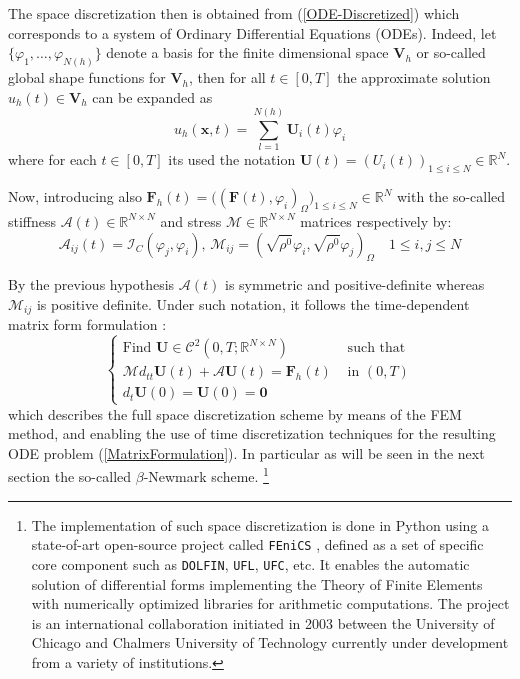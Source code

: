 The space discretization then is obtained from (\ref{ODE-Discretized}) which corresponds to a system of Ordinary Differential Equations (ODEs). Indeed, let $\{ \varphi_1, \dots, \varphi_{N(h)} \}$ denote a basis for the finite dimensional space $\mathbf{V}_h$ or so-called global shape functions for $\mathbf{V}_h$, then for all $t \in [0,T]$ the approximate solution $u_h(t) \in \mathbf{V}_h$ can be expanded as
\begin{equation*}
    u_h(\mathbf{x},t) = \sum \limits_{l=1}^{N(h)} \mathbf{U}_i(t) \varphi_i
\end{equation*}
where for each $t \in [0,T]$ its used the notation $\mathbf{U}(t) = (U_i(t))_{1 \leq i \leq N} \in \mathbb{R}^N$.

Now, introducing also $\mathbf{F}_h(t) = \big( (\mathbf{F}(t), \varphi_i)_{\Omega} \big)_{1 \leq i \leq N}\in \mathbb{R}^N$ with the so-called stiffness $\mathcal{A}(t) \in \mathbb{R}^{N \times N}$ and stress $\mathcal{M} \in \mathbb{R}^{N \times N}$ matrices respectively by:
\begin{equation*}
    \mathcal{A}_{ij}(t) = \mathcal{I}_C(\varphi_j, \varphi_i), \, \mathcal{M}_{ij} = (\sqrt{\rho^0} \varphi_i , \sqrt{\rho^0}\varphi_j)_{\Omega} \quad 1 \leq i,j \leq N
\end{equation*}

By the previous hypothesis $\mathcal{A}(t)$ is symmetric and positive-definite whereas $\mathcal{M}_{ij}$ is positive definite. Under such notation, it follows the time-dependent matrix form formulation :
\begin{equation}
    \label{MatrixFormulation}
    \left \{
    \begin{array}{cc}
        \text{Find } \mathbf{U} \in \mathcal{C}^2(0,T; \mathbb{R}^{N\times N}) & \text{ such that} \\
        \mathcal{M} d_{tt} \mathbf{U}(t) + \mathcal{A}\mathbf{U}(t) = \mathbf{F}_h (t) & \text{ in }(0,T)\\ 
        d_{t} \mathbf{U}(0) = \mathbf{U}(0)  = \mathbf{0}&
    \end{array}
    \right.
\end{equation}
which describes the full space discretization scheme by means of the FEM method, and enabling the use of time discretization techniques for the resulting ODE problem (\ref{MatrixFormulation}). In particular as will be seen in the next section the so-called $\beta$-Newmark scheme. \footnote{The implementation of such space discretization is done in Python using a state-of-art open-source project called \texttt{FEniCS} \cite{logg2012automated}, defined as a set of specific core component such as \texttt{DOLFIN}, \texttt{UFL},  \texttt{UFC}, etc. It enables the automatic solution of differential forms implementing the Theory of Finite Elements with numerically optimized libraries for arithmetic computations. The project is an international collaboration initiated in 2003 between the University of Chicago and Chalmers University of Technology currently under development from a variety of institutions.}

